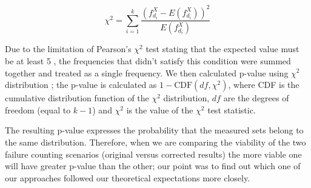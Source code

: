 \documentclass[
	digital,    %
	oneside,    %
	color,
	11pt,
	nocover,
	notable,
	nolof,
	nolot,
]{fithesis3}
\theoremstyle{definition}
\theoremstyle{remark}
\begin{document}
\begin{equation}
\label{eq:chi_square_stat}
\chi^2 = \sum\limits_{i=1}^{k} \frac{  \left(f_{d_i}^{X} - E \left(f_{d_i}^{X}\right) \right)^2 }{E \left(f_{d_i}^{X}\right)}
\end{equation}

Due to the limitation of Pearson's $\chi^2$ test stating that the expected value must be at least 5 \cite[p.~220]{stat-handbook}, the frequencies that didn't satisfy this condition were summed together and treated as a single frequency. We then calculated p-value using $\chi^2$ distribution \cite[p.~116]{stat-handbook}; the p-value is calculated as $1 - \text{CDF}(df, \chi^2)$, where CDF is the cumulative distribution function of the $\chi^2$ distribution, $df$ are the degrees of freedom (equal to $k-1$) and $\chi^2$ is the value of the $\chi^2$ test statistic.

The resulting p-value expresses the probability that the measured sets belong to the same distribution. Therefore, when we are comparing the viability of the two failure counting scenarios (original versus corrected results) the more viable one will have greater p-value than the other; our point was to find out which one of our approaches followed our theoretical expectations more closely.
\end{document}
